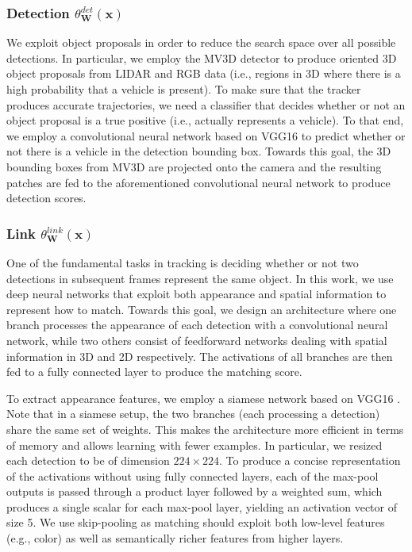 \documentclass[letterpaper, 10 pt, conference]{ieeeconf}  \pdfminorversion=4
\newcommand{\obsvarset}{\mathbf{x}}
\newcommand{\weightset}{\mathbf{W}}
\newcommand{\modelfun}{\theta}
\begin{document}
\subsubsection{\textbf{Detection $\modelfun_\weightset^{det}(\obsvarset)$}}
We exploit object proposals in order to reduce the search space over all possible detections.
In particular, we employ the MV3D detector \cite{mv3d} to produce oriented 3D object proposals from LIDAR and RGB data (i.e., regions in 3D where there is a high probability that a vehicle is present).
To make sure that the tracker produces accurate trajectories, we need a classifier that decides whether or not an object proposal is a true positive (i.e., actually represents a vehicle). To that end, we employ a convolutional neural network based on VGG16 \cite{vgg16} to predict whether or not there is a vehicle in the detection bounding box.
 Towards this goal, the 3D bounding boxes from MV3D are  projected onto the camera and the resulting patches are fed to the aforementioned convolutional neural network to produce detection scores.






\subsubsection{\textbf{Link $\modelfun_\weightset^{link}(\obsvarset)$}}
\label{sec:matching_network}

One of the fundamental tasks in tracking is deciding whether or not two detections in
subsequent frames represent the same object. In this work, we use deep neural networks that exploit both appearance and spatial information to represent how to match. Towards this goal, we design an architecture where one branch processes the appearance of each detection with a convolutional neural network, while two others consist of feedforward networks dealing with spatial information in 3D and 2D respectively. The activations of all branches are then fed to a fully connected layer to produce the matching score.

To extract appearance features, we employ a siamese  network based on VGG16 \cite{vgg16}. Note that in a siamese setup, the two branches (each processing a detection)   share the same set of weights. This makes the architecture more efficient  in terms of memory and allows learning with fewer examples. In particular, we resized each detection to be of dimension $224\times224$. To produce a concise representation of the activations without using fully connected layers, each of the max-pool outputs is passed through a product layer followed by a weighted sum, which produces a single scalar for each max-pool layer, yielding an activation vector of size 5. We use skip-pooling as matching should exploit both low-level features (e.g., color) as well as semantically richer features from higher layers.
\end{document}
